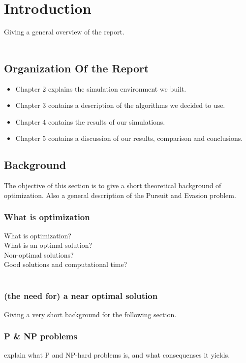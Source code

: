 \chapter{Introduction}
Giving a general overview of the report.\\
\\



\section{Organization Of the Report}

\begin{itemize}
\item Chapter 2 explains the simulation environment we built.
\item Chapter 3 contains a description of the algorithms we decided to use.
\item Chapter 4 contains the results of our simulations.
\item Chapter 5 contains a discussion of our results, comparison and conclusions.
\end{itemize}




\section{Background}
The objective of this section is to give a short theoretical
background of optimization. Also a general description of the Pursuit and Evasion problem.
\subsection{What is optimization}
What is optimization?\\
What is an optimal solution?\\
Non-optimal solutions?\\
Good solutions and computational time?\\
\\

\subsection{(the need for) a near optimal solution}
Giving a very short background for the following section. 

\subsection{P \& NP problems}
explain what P and NP-hard problems is, and what consequenses it yields. 

